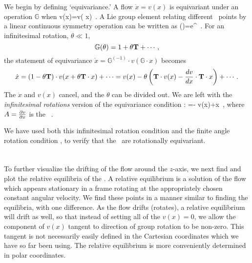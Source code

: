 We begin by defining `equivariance.'
A flow $\dot{x}= v(x)$ is equivariant under an operation $\mathbb{G}$ when
\beq
{} \cdot v(x)=v( \cdot x)
\,.
A Lie group element relating different \statesp\ points by a
linear continuous symmetry operation can be written as
\beq
{}(\theta)=e^{{\theta} \Lg }
\,.
For an infinitesimal rotation, $\theta \ll 1$,
\[
\mathbb{G}(\theta)=1+\theta  \Lg  + \cdots
\,,
\]
the statement of equivariance
$
\dot{x}=\mathbb{G}^{(-1)} \cdot v(\mathbb{G} \cdot x)
$
becomes
\[
\dot{x}=(1-\theta \mathbf{T} ) \cdot v(x+\theta  \mathbf{T} \cdot x) + \cdots
       =v(x)-\theta \left(
            \mathbf{T} \cdot v(x) - \frac{dv}{dx} \cdot \mathbf{T} \cdot x
                     \right)  + \cdots
\,.
\]
The $\dot{x}$ and $v(x)$ cancel, and the $\theta$ can be
divided out. We are left with the {\em infinitesimal
rotations} version of the equivariance condition
:
=- \Lg \cdot v(x)+\Mvar \cdot \Lg \cdot x
\,,
\label{eq:InfnmslRot}
\eeq
where $A = \frac{\partial v}{\partial x}$ is the \stabmat\ .

We have used both this infinitesimal rotation condition and
the finite angle rotation condition , to
verify that the \cLe\ are rotationally equivariant.


\section{\Reqva}

To further visualize the drifting of the flow around the
$z$-axis, we next find and plot the relative equilibria of
the \cLe. A relative equilibrium is a solution of the flow
which appears stationary in a frame rotating at the
appropriately chosen constant angular velocity. We find these
points in a manner similar to finding the equilibria, with
one difference. As the flow drifts (rotates), a relative
equilibrium will drift as well, so that instead of setting
all of the $v(x)=0$, we allow the component of $v(x)$ tangent
to direction of group rotation to be non-zero. This tangent is not
necessarily easily defined in the
Cartesian coordinates which we have so far been using. The
relative equilibrium is more conveniently determined  in
polar coordinates.

